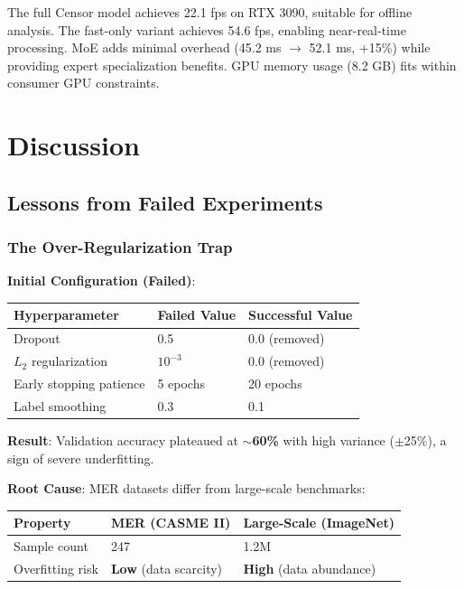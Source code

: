 \documentclass[preprint,12pt,authoryear]{elsarticle}
\begin{document}
The full Censor model achieves 22.1 fps on RTX 3090, suitable for offline analysis. The fast-only variant achieves 54.6 fps, enabling near-real-time processing. MoE adds minimal overhead (45.2 ms $\rightarrow$ 52.1 ms, +15\%) while providing expert specialization benefits. GPU memory usage (8.2 GB) fits within consumer GPU constraints.

\section{Discussion}

\subsection{Lessons from Failed Experiments}

\subsubsection{The Over-Regularization Trap}

\textbf{Initial Configuration (Failed)}:

\begin{table}[htbp]
\centering
\begin{tabular}{lll}
\toprule
\textbf{Hyperparameter} & \textbf{Failed Value} & \textbf{Successful Value} \\
\midrule
Dropout & 0.5 & 0.0 (removed) \\
$L_2$ regularization & $10^{-3}$ & 0.0 (removed) \\
Early stopping patience & 5 epochs & 20 epochs \\
Label smoothing & 0.3 & 0.1 \\
\bottomrule
\end{tabular}
\end{table}

\textbf{Result}: Validation accuracy plateaued at \textbf{$\sim$60\%} with high variance ($\pm$25\%), a sign of severe underfitting.

\textbf{Root Cause}: MER datasets differ from large-scale benchmarks:

\begin{table}[htbp]
\centering
\begin{tabular}{lll}
\toprule
\textbf{Property} & \textbf{MER (CASME II)} & \textbf{Large-Scale (ImageNet)} \\
\midrule
Sample count & 247 & 1.2M \\
Overfitting risk & \textbf{Low} (data scarcity) & \textbf{High} (data abundance) \\
\bottomrule
\end{tabular}
\end{table}
\end{document}
